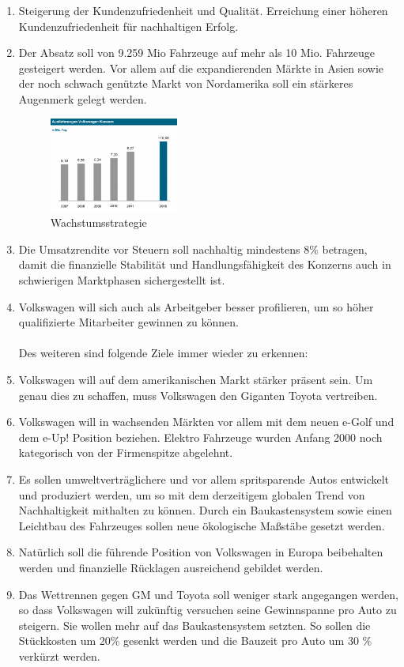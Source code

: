 \documentclass[12pt]{article}
\begin{document}
\begin{enumerate}
\item Steigerung der Kundenzufriedenheit und Qualität. Erreichung einer höheren Kundenzufriedenheit für nachhaltigen Erfolg.
\item Der Absatz soll von 9.259 Mio Fahrzeuge auf mehr als 10 Mio. Fahrzeuge gesteigert werden.  Vor allem auf die expandierenden Märkte in Asien sowie der noch schwach genützte Markt von Nordamerika soll ein stärkeres Augenmerk gelegt werden.
\begin{figure}[here!]
\centering
\includegraphics[width=0.4\textwidth]{images/strategie}
\caption{ Wachstumsstrategie \cite{vwamstrategie3}}
\end{figure}\FloatBarrier
\noindent
\item Die Umsatzrendite vor Steuern soll nachhaltig mindestens 8\% betragen, damit die finanzielle Stabilität und Handlungsfähigkeit des Konzerns auch in schwierigen Marktphasen sichergestellt ist. 
\item Volkswagen will sich auch als Arbeitgeber besser profilieren, um so höher qualifizierte Mitarbeiter gewinnen zu können.  \\\\
Des weiteren sind folgende Ziele immer wieder zu erkennen: \\
\item Volkswagen will auf dem amerikanischen Markt stärker präsent sein. Um genau dies zu schaffen, muss Volkswagen den Giganten Toyota vertreiben. \cite{ec1}
\item Volkswagen will in wachsenden Märkten vor allem mit dem neuen e-Golf und dem e-Up! Position beziehen. Elektro Fahrzeuge wurden Anfang 2000 noch kategorisch von der Firmenspitze abgelehnt. \cite{ec3} 
\item Es sollen umweltverträglichere und vor allem spritsparende Autos entwickelt und produziert werden, um so mit dem derzeitigem globalen Trend von Nachhaltigkeit mithalten zu können. Durch ein Baukastensystem sowie einen Leichtbau des Fahrzeuges sollen neue ökologische Maßstäbe gesetzt werden.
\item Natürlich soll die führende Position von Volkswagen in Europa beibehalten werden und finanzielle Rücklagen ausreichend gebildet werden.
\item Das Wettrennen gegen GM und Toyota soll weniger stark angegangen werden, so dass Volkswagen will zukünftig versuchen seine Gewinnspanne pro Auto zu steigern. Sie wollen mehr auf das Baukastensystem setzten. So sollen die Stückkosten um 20\% gesenkt werden und die Bauzeit pro Auto um 30 \% verkürzt werden. \cite{vwamstrategie}
\end{enumerate}
\newpage
\end{document}
